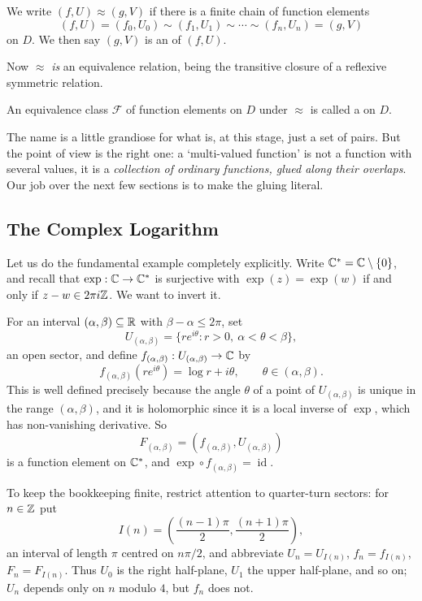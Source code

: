 \documentclass[a4paper]{scrartcl}
\newcommand{\id}{\operatorname{id}}
\newcommand{\Cs}{\C^*}
\begin{document}
\begin{definition}
	We write $(f, U) \approx (g, V)$ if there is a finite chain of function elements
	$$
	(f, U) = (f_0, U_0) \sim (f_1, U_1) \sim \cdots \sim (f_n, U_n) = (g, V)
	$$
	on $D$. We then say $(g,V)$ is an  of $(f,U)$.
\end{definition}

Now $\approx$ \emph{is} an equivalence relation, being the transitive closure of a
reflexive symmetric relation.

\begin{definition}
	An equivalence class $\mathcal{F}$ of function elements on $D$ under $\approx$ is
	called a  on $D$.
\end{definition}

The name is a little grandiose for what is, at this stage, just a set of pairs. But the
point of view is the right one: a `multi-valued function' is not a function with several
values, it is a \emph{collection of ordinary functions, glued along their overlaps}. Our
job over the next few sections is to make the gluing literal.

\subsection{The Complex Logarithm}\label{subsec:logelements}

Let us do the fundamental example completely explicitly. Write $\Cs = \C \setminus \{0\}$,
and recall that $\exp : \C \to \Cs$ is surjective with $\exp(z) = \exp(w)$ if and only if
$z - w \in 2\pi i \mathbb{Z}$. We want to invert it.

For an interval $(\alpha, \beta) \subseteq \mathbb{R}$ with $\beta - \alpha \leq 2\pi$, set
$$
U_{(\alpha, \beta)} = \{ r e^{i\theta} : r > 0, \ \alpha < \theta < \beta\},
$$
an open sector, and define $f_{(\alpha,\beta)} : U_{(\alpha,\beta)} \to \mathbb{C}$ by
$$
f_{(\alpha,\beta)}(re^{i\theta}) = \log r + i \theta, \qquad \theta \in (\alpha,\beta).
$$
This is well defined precisely because the angle $\theta$ of a point of
$U_{(\alpha,\beta)}$ is unique in the range $(\alpha,\beta)$, and it is holomorphic since
it is a local inverse of $\exp$, which has non-vanishing derivative. So
$$
F_{(\alpha,\beta)} = (f_{(\alpha,\beta)}, U_{(\alpha,\beta)})
$$
is a function element on $\Cs$, and $\exp \circ f_{(\alpha,\beta)} = \id$.

To keep the bookkeeping finite, restrict attention to quarter-turn sectors: for
$n \in \mathbb{Z}$ put
$$
I(n) = \left( \frac{(n-1)\pi}{2}, \frac{(n+1)\pi}{2} \right),
$$
an interval of length $\pi$ centred on $n\pi/2$, and abbreviate $U_n = U_{I(n)}$,
$f_n = f_{I(n)}$, $F_n = F_{I(n)}$. Thus $U_0$ is the right half-plane, $U_1$ the upper
half-plane, and so on; $U_n$ depends only on $n$ modulo $4$, but $f_n$ does not.
\end{document}

